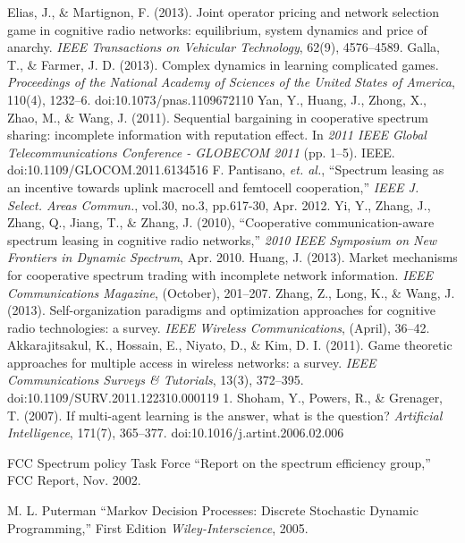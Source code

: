 \begin{thebibliography}{1}
 Elias, J., \& Martignon, F. (2013). Joint operator pricing and network selection game in cognitive radio networks: equilibrium, system dynamics and price of anarchy. \textit{IEEE Transactions on Vehicular Technology}, 62(9), 4576–4589. 
 Galla, T., \& Farmer, J. D. (2013). Complex dynamics in learning complicated games. \textit{Proceedings of the National Academy of Sciences of the United States of America}, 110(4), 1232–6. doi:10.1073/pnas.1109672110
 Yan, Y., Huang, J., Zhong, X., Zhao, M., \& Wang, J. (2011). Sequential bargaining in cooperative spectrum sharing: incomplete information with reputation effect. In \textit{2011 IEEE Global Telecommunications Conference - GLOBECOM 2011} (pp. 1–5). IEEE. doi:10.1109/GLOCOM.2011.6134516
 F. Pantisano, \textit{et. al.}, ``Spectrum leasing as an incentive towards uplink macrocell and femtocell cooperation,'' \textit{IEEE J. Select. Areas Commun.}, vol.30, no.3, pp.617-30, Apr. 2012.
 Yi, Y., Zhang, J., Zhang, Q., Jiang, T., \& Zhang, J. (2010), ``Cooperative communication-aware spectrum leasing in cognitive radio networks,'' \textit{2010 IEEE Symposium on New Frontiers in Dynamic Spectrum}, Apr. 2010.
 Huang, J. (2013). Market mechanisms for cooperative spectrum trading with incomplete network information. \textit{IEEE Communications Magazine}, (October), 201–207. 
 Zhang, Z., Long, K., \& Wang, J. (2013). Self-organization paradigms and optimization approaches for cognitive radio technologies: a survey. \textit{IEEE Wireless Communications}, (April), 36–42. 
 Akkarajitsakul, K., Hossain, E., Niyato, D., \& Kim, D. I. (2011). Game theoretic approaches for multiple access in wireless networks: a survey. \textit{IEEE Communications Surveys \& Tutorials}, 13(3), 372–395. doi:10.1109/SURV.2011.122310.000119
1. Shoham, Y., Powers, R., \& Grenager, T. (2007). If multi-agent learning is the answer, what is the question? \textit{Artificial Intelligence}, 171(7), 365–377. doi:10.1016/j.artint.2006.02.006






FCC Spectrum policy Task Force ``Report on the spectrum efficiency group,'' FCC Report, Nov. 2002.


 M. L. Puterman ``Markov Decision Processes: Discrete Stochastic Dynamic Programming,'' First Edition  \emph{Wiley-Interscience}, 2005.


\end{thebibliography}
